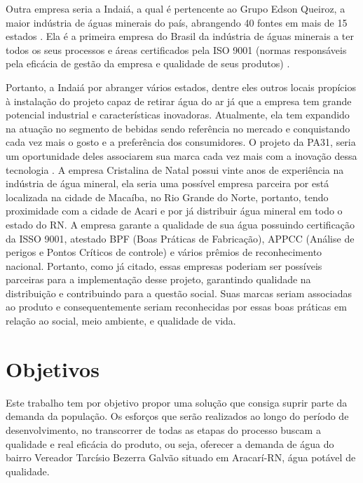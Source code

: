       Outra empresa seria a Indaiá, a qual é pertencente ao Grupo Edson Queiroz, a maior indústria de águas minerais do país, 
      abrangendo 40 fontes em mais de 15 estados \footnotemark.
      Ela é a primeira empresa do Brasil da indústria de águas minerais
      a ter todos os seus processos e áreas certificados pela ISO 9001 (normas responsáveis pela eficácia de gestão da empresa e
      qualidade de seus produtos) \cite{iso9001}.
      
      Portanto, a Indaiá por abranger vários estados, dentre eles outros locais propícios à instalação do projeto capaz de retirar 
      água do ar já que a empresa tem grande potencial industrial e características inovadoras. Atualmente, ela tem expandido na
      atuação no segmento de bebidas sendo referência no mercado e conquistando cada vez mais o gosto e a preferência dos
      consumidores. O projeto da PA31, seria um oportunidade deles associarem sua marca cada vez mais com a inovação dessa
      tecnologia \footnotemark.
	A empresa Cristalina de Natal possui vinte anos de experiência na indústria de água mineral, ela seria uma possível empresa parceira por está localizada na cidade de Macaíba, no Rio Grande do Norte, portanto, tendo proximidade com a cidade de Acari e por já distribuir água mineral em todo o estado do RN\footnotemark. A empresa garante a qualidade de sua água possuindo certificação da ISSO 9001, atestado BPF (Boas Práticas de Fabricação), APPCC (Análise de perigos e Pontos Críticos de controle) e vários prêmios de reconhecimento nacional\footnotemark.
	Portanto, como já citado, essas empresas poderiam ser possíveis parceiras para a implementação desse projeto, garantindo qualidade na distribuição e contribuindo para a questão social. Suas marcas seriam associadas ao produto e consequentemente seriam reconhecidas por essas boas práticas em relação ao social, meio ambiente, e qualidade de vida.
      
      

    
\pagebreak
\section{Objetivos}

Este trabalho tem por objetivo propor uma solução que consiga suprir parte da demanda da população. Os esforços que serão
realizados ao longo do período de desenvolvimento, no transcorrer de todas as etapas do processo buscam a qualidade e real
eficácia do produto, ou seja, oferecer a demanda de água do bairro Vereador Tarcísio Bezerra Galvão situado em Aracarí-RN, 
água potável de qualidade.

